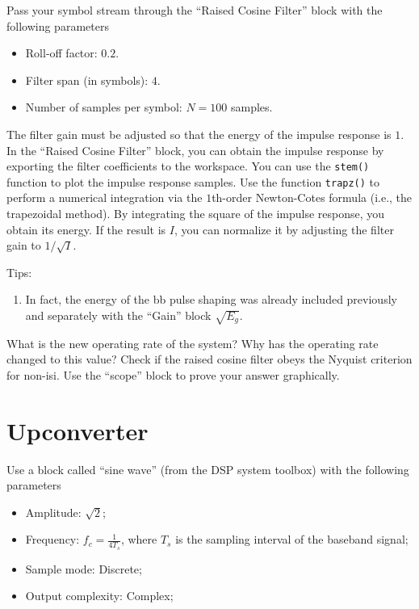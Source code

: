 \documentclass[12pt,a4paper]{article}
\begin{document}
\problem Pass your symbol stream through the ``Raised Cosine Filter'' block with the following parameters
\begin{itemize}
    \item Roll-off factor: \(0.2\).
    \item Filter span (in symbols): \(4\).
    \item Number of samples per symbol: \(N=100\) samples.
\end{itemize}
The filter gain must be adjusted so that the energy of the impulse response is \(1\). In the ``Raised Cosine Filter'' block, you can obtain the impulse response by exporting the filter coefficients to the workspace. You can use the \texttt{stem()} function to plot the impulse response samples. Use the function \texttt{trapz()} to perform a numerical integration via the \(1\)th-order Newton-Cotes formula (i.e., the trapezoidal method). By integrating the square of the impulse response, you obtain its energy. If the result is \(I\), you can normalize it by adjusting the filter gain to \(1/\sqrt{I}\).

Tips:
\begin{enumerate}
    \item In fact, the energy of the \gls{bb} pulse shaping was already included previously and separately with the ``Gain'' block \(\sqrt{E_g}\).
\end{enumerate}
\subproblem What is the new operating rate of the system? Why has the operating rate changed to this value?
\subproblem Check if the raised cosine filter obeys the Nyquist criterion for non-\gls{isi}. Use the ``scope'' block to prove your answer graphically.

\section{Upconverter}

\problem Use a block called ``sine wave'' (from the DSP system toolbox) with the following parameters
\begin{itemize}
    \item Amplitude: \(\sqrt{2}\);
    \item Frequency: \(f_c = \frac{1}{4T_{s}}\), where \(T_{s}\) is the sampling interval of the baseband signal;
    \item Sample mode: Discrete;
    \item Output complexity: Complex;
\end{itemize}
\end{document}
